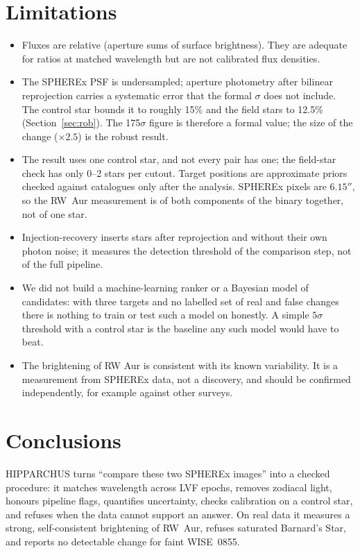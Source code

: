 \documentclass[11pt,a4paper]{article}
\begin{document}
\section{Limitations}
\begin{itemize}\setlength\itemsep{1pt}
\item Fluxes are relative (aperture sums of surface brightness). They are adequate for ratios at matched wavelength
but are not calibrated flux densities.
\item The SPHEREx PSF is undersampled; aperture photometry after bilinear reprojection carries a systematic error that
the formal $\sigma$ does not include. The control star bounds it to roughly 15\% and the field stars to 12.5\%
(Section~\ref{sec:rob}). The 175$\sigma$ figure is therefore a formal value; the size of the change ($\times2.5$) is
the robust result.
\item The result uses one control star, and not every pair has one; the field-star check has only 0--2 stars per cutout. Target positions are approximate priors checked
against catalogues only after the analysis. SPHEREx pixels are $6.15''$, so the RW~Aur measurement is of both
components of the binary together, not of one star.
\item Injection-recovery inserts stars after reprojection and without their own photon noise; it measures the
detection threshold of the comparison step, not of the full pipeline.
\item We did not build a machine-learning ranker or a Bayesian model of candidates: with three targets and no
labelled set of real and false changes there is nothing to train or test such a model on honestly. A simple
$5\sigma$ threshold with a control star is the baseline any such model would have to beat.
\item The brightening of RW Aur is consistent with its known variability. It is a measurement from SPHEREx data, not a
discovery, and should be confirmed independently, for example against other surveys.
\end{itemize}

\section{Conclusions}
HIPPARCHUS turns ``compare these two SPHEREx images'' into a checked procedure: it matches wavelength across LVF
epochs, removes zodiacal light, honours pipeline flags, quantifies uncertainty, checks calibration on a control star,
and refuses when the data cannot support an answer. On real data it measures a strong, self-consistent brightening of
RW~Aur, refuses saturated Barnard's Star, and reports no detectable change for faint WISE~0855.
\end{document}
